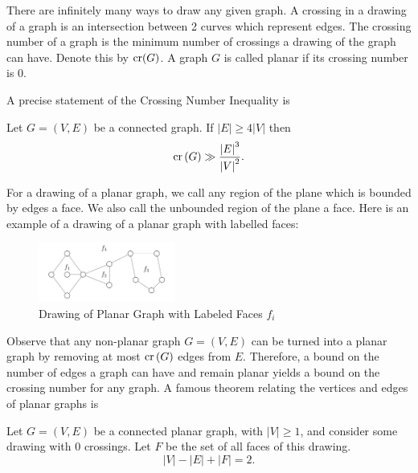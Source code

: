 \documentclass[12pt,reqno]{amsart}
\begin{document}
There are infinitely many ways to draw any given graph. A crossing in a drawing
of a graph is an intersection between 2 curves which represent edges. The 
crossing number of a graph is the minimum number of crossings a drawing
of the graph can have. Denote this by
\(\operatorname{cr}(G)\). A graph \(G\) is called planar if its crossing number is 0.

A precise statement of the Crossing Number Inequality is

\begin{theorem}\label{thm:crossing-number-inequality}
    Let \(G = (V,E)\) be a connected graph. If \(\left\lvert E \right\rvert \geq 4 \left\lvert V \right\rvert \)
    then
    \[
        \operatorname{cr}\left( G \right) \gg \frac{\left\lvert E \right\rvert ^{3} }{\left\lvert V \right\rvert ^{2}}  
    .\]
\end{theorem}

For a drawing of a planar graph, we call any region of the plane which is bounded by edges a face. We also call
the unbounded region of the plane a face. Here is an example of a drawing of a planar
graph with labelled faces:

\begin{figure}[h]
    \centering
    \includegraphics[width=0.4\textwidth]{faceimage.png}
    \caption{Drawing of Planar Graph with Labeled Faces \(f_{i} \)}
\end{figure}

Observe that any non-planar graph \(G = (V,E)\) can be turned into a planar graph by removing at most
\(\operatorname{cr}\left( G \right) \) edges from \(E\). Therefore, a bound on the number of
edges a graph can have and remain planar yields a bound on the crossing number for any graph.
A famous theorem relating the vertices and edges of planar graphs is

\begin{theorem}\label{thm:euler-formula-graphs}
Let \(G = (V,E)\) be a connected planar graph, with \(\left\lvert V \right\rvert \geq 1\), and consider some drawing with 0 crossings.
Let \(F\) be the set of all faces of this drawing.
\[
    \left\lvert V \right\rvert - \left\lvert E \right\rvert + \left\lvert F \right\rvert = 2
.\]
\end{theorem}
\end{document}
